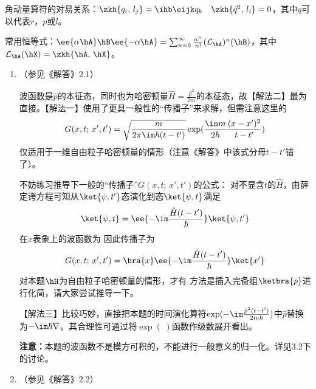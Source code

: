 角动量算符的对易关系：$\zkh{q_i,\,l_j}=\ihb\eijk q_k\quad\zkh{\vec{q}^2,\,l_i}=0$，其中$q$可以代表$r$，$p$或$l$。

常用恒等式：$\ee{\alpha\hA}\hB\ee{-\alpha\hA}=\sum_{n=0}^\infty\frac{\alpha^n}{n!}(\mathcal{L}_{\hA})^n(\hB)$，其中$\mathcal{L}_{\hA}(\hX)=\zkh{\hA,\,\hX}$。

\begin{enumerate}[label=\textbf{3.\arabic*}]

\item
（参见《解答》2.1）

波函数是$\hat{p}$的本征态，同时也为哈密顿量$\hat{H}=\frac{\hat{p}^2}{2m}$的本征态，故【解法二】最为直接。【解法一】使用了更具一般性的“传播子”来求解，但需注意这里的
\[G(x,t;\,x',t') = \sqrt{\frac{m}{2\pi\im\hbar (t-t')}}\exp(\frac{\im m}{2\hbar}\frac{(x-x')^2}{t-t'})\]
仅适用于一维自由粒子哈密顿量的情形（注意《解答》中该式分母$t-t'$错了）。

不妨练习推导下一般的“传播子”$G(x,t;\,x',t')$的公式：
对不显含$t$的$\hat{H}$，由薛定谔方程可知从$\ket{\psi,t'}$态演化到态$\ket{\psi,t}$满足
\[\ket{\psi,t} = \ee{-\im\frac{\hat{H}(t-t')}{\hbar}}\ket{\psi,t'}\]
在$x$表象上的波函数为
因此传播子为
\[G(x,t;\,x',t') = \bra{x}\ee{-\im\frac{\hat{H}(t-t')}{\hbar}}\ket{x'}\]
对本题$\hH$为自由粒子哈密顿量的情形，才有
方法是插入完备组$\ketbra{p}$进行化简，请大家尝试推导一下。

【解法三】比较巧妙，直接把本题的时间演化算符$\exp(-\im\frac{\hat{p}^2(t-t')}{2m \hbar})$中$\hat{p}$替换为$-\im\hbar\nabla$。其合理性可通过将$\exp(\;)$函数作级数展开看出。

\textbf{注意：}本题的波函数不是模方可积的，不能进行一般意义的归一化。详见3.2下的讨论。

\item （参见《解答》2.2）


\end{enumerate}
